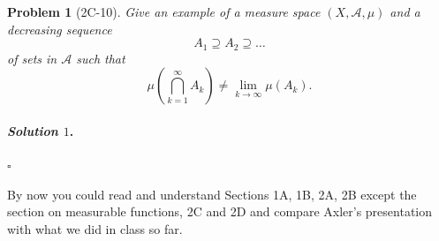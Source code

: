 \documentclass[reqno]{amsart}
\theoremstyle{plain}
\newtheorem{problem}{Problem}
\theoremstyle{definition}
\newenvironment{solution1}{\paragraph{\emph{Solution $1$}.}}{\hfill$\square$}
\begin{document}
\begin{problem}[2C-10]
Give an example of a measure space $(X,\mathcal{A},\mu)$ and a decreasing sequence
$$A_{1} \supseteq A_{2} \supseteq \ldots $$
of sets in $\mathcal{A}$ such that
$$\mu \left( \bigcap_{k=1}^{\infty} A_{k}\right) \neq \lim_{k \to \infty} \mu(A_{k}). $$
\end{problem}
\begin{solution1}

\end{solution1}

By now you could read and understand Sections 1A, 1B, 2A, 2B except the section on measurable functions, 2C and 2D and compare Axler's presentation with what we did in class so far.  
\end{document}
